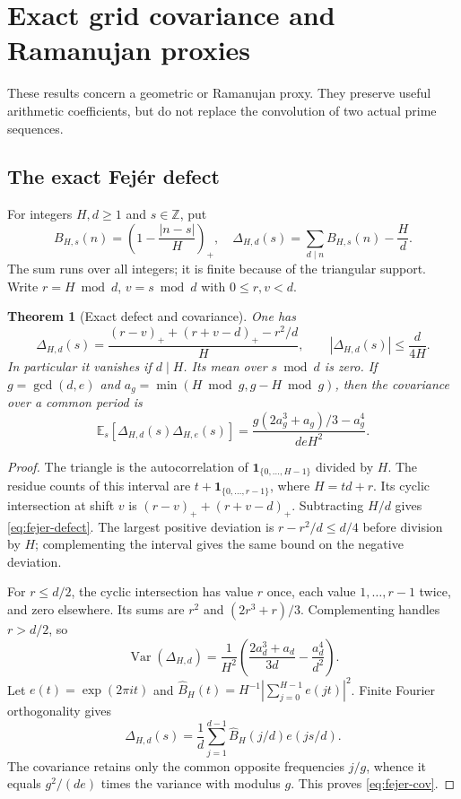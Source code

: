 \documentclass[11pt,a4paper]{article}
\newtheorem{theorem}{Theorem}[section]
\theoremstyle{definition}
\theoremstyle{remark}
\newcommand{\ind}{\mathbf1}
\begin{document}
\section{Exact grid covariance and Ramanujan proxies}\label{sec:proxy}
These results concern a geometric or Ramanujan proxy. They preserve useful arithmetic coefficients, but do not replace the convolution of two actual prime sequences.

\subsection{The exact Fej\'er defect}
For integers $H,d\ge1$ and $s\in\mathbb Z$, put
\[ B_{H,s}(n)=\left(1-\frac{|n-s|}{H}\right)_+,
 \quad\Delta_{H,d}(s)=\sum_{d\mid n}B_{H,s}(n)-\frac Hd.\]
The sum runs over all integers; it is finite because of the triangular support. Write $r=H\bmod d$, $v=s\bmod d$ with $0\le r,v<d$.
\begin{theorem}[Exact defect and covariance]\label{thm:fejer}
One has
\begin{equation}\label{eq:fejer-defect}
 \Delta_{H,d}(s)=\frac{(r-v)_++(r+v-d)_+-r^2/d}{H},
 \qquad |\Delta_{H,d}(s)|\le\frac d{4H}.
\end{equation}
In particular it vanishes if $d\mid H$. Its mean over $s\bmod d$ is zero. If $g=\gcd(d,e)$ and $a_g=\min(H\bmod g,g-H\bmod g)$, then the covariance over a common period is
\begin{equation}\label{eq:fejer-cov}
 \mathbb E_s[\Delta_{H,d}(s)\Delta_{H,e}(s)]
 =\frac{g(2a_g^3+a_g)/3-a_g^4}{deH^2}.
\end{equation}
\end{theorem}
\begin{proof}
The triangle is the autocorrelation of $\ind_{\{0,\ldots,H-1\}}$ divided by $H$. The residue counts of this interval are $t+\ind_{\{0,\ldots,r-1\}}$, where $H=td+r$. Its cyclic intersection at shift $v$ is $(r-v)_++(r+v-d)_+$. Subtracting $H/d$ gives \eqref{eq:fejer-defect}. The largest positive deviation is $r-r^2/d\le d/4$ before division by $H$; complementing the interval gives the same bound on the negative deviation.

For $r\le d/2$, the cyclic intersection has value $r$ once, each value $1,\ldots,r-1$ twice, and zero elsewhere. Its sums are $r^2$ and $(2r^3+r)/3$. Complementing handles $r>d/2$, so
\[\operatorname{Var}(\Delta_{H,d})
 =\frac1{H^2}\left(\frac{2a_d^3+a_d}{3d}-\frac{a_d^4}{d^2}\right).\]
Let $e(t)=\exp(2\pi it)$ and $\widehat B_H(t)=H^{-1}|\sum_{j=0}^{H-1}e(jt)|^2$. Finite Fourier orthogonality gives
\[ \Delta_{H,d}(s)=\frac1d\sum_{j=1}^{d-1}\widehat B_H(j/d)e(js/d).\]
The covariance retains only the common opposite frequencies $j/g$, whence it equals $g^2/(de)$ times the variance with modulus $g$. This proves \eqref{eq:fejer-cov}.
\end{proof}
\end{document}
